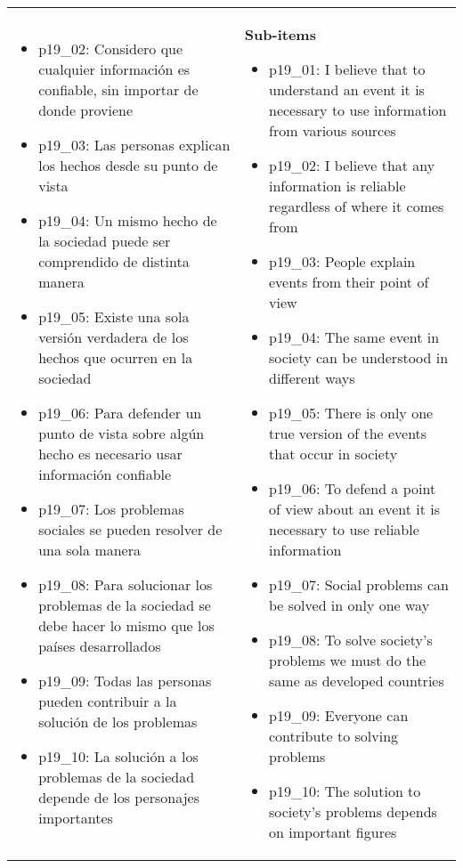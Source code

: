 \documentclass[11pt]{article}
\begin{document}
\begin{longtable}{@{}LL@{}}
\begin{itemize}[leftmargin=*]
\item p19\_02: Considero que cualquier información es confiable, sin importar de donde proviene
\item p19\_03: Las personas explican los hechos desde su punto de vista
\item p19\_04: Un mismo hecho de la sociedad puede ser comprendido de distinta manera
\item p19\_05: Existe una sola versión verdadera de los hechos que ocurren en la sociedad
\item p19\_06: Para defender un punto de vista sobre algún hecho es necesario usar información confiable
\item p19\_07: Los problemas sociales se pueden resolver de una sola manera
\item p19\_08: Para solucionar los problemas de la sociedad se debe hacer lo mismo que los países desarrollados
\item p19\_09: Todas las personas pueden contribuir a la solución de los problemas
\item p19\_10: La solución a los problemas de la sociedad depende de los personajes importantes\end{itemize} & \textbf{Sub-items}\par\begin{itemize}[leftmargin=*]\item p19\_01: I believe that to understand an event it is necessary to use information from various sources
\item p19\_02: I believe that any information is reliable regardless of where it comes from
\item p19\_03: People explain events from their point of view
\item p19\_04: The same event in society can be understood in different ways
\item p19\_05: There is only one true version of the events that occur in society
\item p19\_06: To defend a point of view about an event it is necessary to use reliable information
\item p19\_07: Social problems can be solved in only one way
\item p19\_08: To solve society's problems we must do the same as developed countries
\item p19\_09: Everyone can contribute to solving problems
\item p19\_10: The solution to society's problems depends on important figures\end{itemize} \\

\end{longtable}
\end{document}
